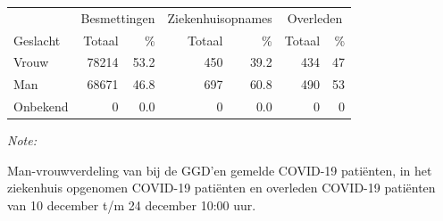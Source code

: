 \documentclass[
  english,
  man,floatsintext]{apa6}
\begin{document}
\begin{table}[H]
\centering\begingroup\fontsize{11}{13}\selectfont

\begin{threeparttable}
\begin{tabular}{lrrrrrr}
\toprule
\multicolumn{1}{c}{ } & \multicolumn{2}{c}{Besmettingen} & \multicolumn{2}{c}{Ziekenhuisopnames} & \multicolumn{2}{c}{Overleden} \\
\cmidrule(l{3pt}r{3pt}){2-3} \cmidrule(l{3pt}r{3pt}){4-5} \cmidrule(l{3pt}r{3pt}){6-7}
Geslacht & Totaal & \% & Totaal & \% & Totaal & \%\\
\midrule
Vrouw & 78214 & 53.2 & 450 & 39.2 & 434 & 47\\
Man & 68671 & 46.8 & 697 & 60.8 & 490 & 53\\
Onbekend & 0 & 0.0 & 0 & 0.0 & 0 & 0\\
\bottomrule
\end{tabular}
\begin{tablenotes}
\item \textit{Note: } 
\item Man-vrouwverdeling van bij de GGD’en gemelde COVID-19 patiënten, in het ziekenhuis opgenomen COVID-19 patiënten en overleden COVID-19 patiënten van 10 december t/m 24 december 10:00 uur.
\end{tablenotes}
\end{threeparttable}
\endgroup{}
\end{table}
\newpage
\end{document}
